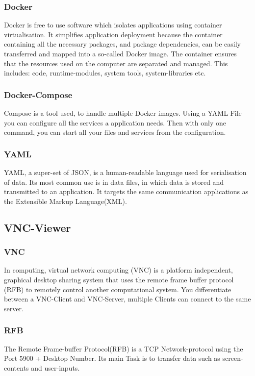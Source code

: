 \subsubsection{Docker}
Docker is free to use software which isolates applications using container virtualisation. It simplifies application deployment because the container containing all the necessary packages, and package dependencies, can be easily transferred and mapped into a so-called Docker image. The container ensures that the resources used on the computer are separated and managed. This includes: code, runtime-modules, system tools, system-libraries etc.

\subsubsection{Docker-Compose}
Compose is a tool used, to handle multiple Docker images. Using a YAML-File you can configure all the services a application needs. Then with only one command, you can start all your files and services from the configuration.

\subsubsection{YAML}
YAML, a super-set of JSON, is a human-readable language used for serialisation of data. Its most common use is in data files, in which data is stored and transmitted to an application. It targets the same communication applications as the Extensible Markup Language(XML). 

\subsection{VNC-Viewer}

\subsubsection{VNC}
In computing, virtual network computing (VNC) is a platform independent, graphical desktop sharing system that uses the remote frame buffer protocol (RFB) to remotely control another computational system. You differentiate between a VNC-Client and VNC-Server, multiple Clients can connect to the same server.

\subsubsection{RFB}
The Remote Frame-buffer Protocol(RFB) is a TCP Network-protocol using the Port 5900 + Desktop Number. Its main Task is to transfer data such as screen-contents and user-inputs.

